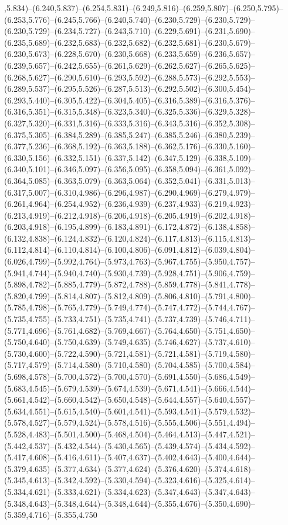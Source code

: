 ,5.834)--(6.240,5.837)--(6.254,5.831)--(6.249,5.816)--(6.259,5.807)--(6.250,5.795)--(6.253,5.776)--(6.245,5.766)--(6.240,5.740)--(6.230,5.729)--(6.230,5.729)--(6.230,5.729)--(6.234,5.727)--(6.243,5.710)--(6.229,5.691)--(6.231,5.690)--(6.235,5.689)--(6.232,5.683)--(6.232,5.682)--(6.232,5.681)--(6.230,5.679)--(6.230,5.673)--(6.228,5.670)--(6.230,5.668)--(6.233,5.659)--(6.236,5.657)--(6.239,5.657)--(6.242,5.655)--(6.261,5.629)--(6.262,5.627)--(6.265,5.625)--(6.268,5.627)--(6.290,5.610)--(6.293,5.592)--(6.288,5.573)--(6.292,5.553)--(6.289,5.537)--(6.295,5.526)--(6.287,5.513)--(6.292,5.502)--(6.300,5.454)--(6.293,5.440)--(6.305,5.422)--(6.304,5.405)--(6.316,5.389)--(6.316,5.376)--(6.316,5.351)--(6.315,5.348)--(6.323,5.340)--(6.325,5.336)--(6.329,5.328)--(6.327,5.320)--(6.331,5.316)--(6.333,5.316)--(6.343,5.316)--(6.352,5.308)--(6.375,5.305)--(6.384,5.289)--(6.385,5.247)--(6.385,5.246)--(6.380,5.239)--(6.377,5.236)--(6.368,5.192)--(6.363,5.188)--(6.362,5.176)--(6.330,5.160)--(6.330,5.156)--(6.332,5.151)--(6.337,5.142)--(6.347,5.129)--(6.338,5.109)--(6.340,5.101)--(6.346,5.097)--(6.356,5.095)--(6.358,5.094)--(6.361,5.092)--(6.364,5.085)--(6.363,5.079)--(6.363,5.064)--(6.352,5.041)--(6.331,5.013)--(6.317,5.007)--(6.310,4.986)--(6.296,4.987)--(6.290,4.969)--(6.279,4.979)--(6.261,4.964)--(6.254,4.952)--(6.236,4.939)--(6.237,4.933)--(6.219,4.923)--(6.213,4.919)--(6.212,4.918)--(6.206,4.918)--(6.205,4.919)--(6.202,4.918)--(6.203,4.918)--(6.195,4.899)--(6.183,4.891)--(6.172,4.872)--(6.138,4.858)--(6.132,4.838)--(6.124,4.832)--(6.120,4.824)--(6.117,4.813)--(6.115,4.813)--(6.112,4.814)--(6.110,4.814)--(6.100,4.806)--(6.091,4.812)--(6.039,4.804)--(6.026,4.799)--(5.992,4.764)--(5.973,4.763)--(5.967,4.755)--(5.950,4.757)--(5.941,4.744)--(5.940,4.740)--(5.930,4.739)--(5.928,4.751)--(5.906,4.759)--(5.898,4.782)--(5.885,4.779)--(5.872,4.788)--(5.859,4.778)--(5.841,4.778)--(5.820,4.799)--(5.814,4.807)--(5.812,4.809)--(5.806,4.810)--(5.791,4.800)--(5.785,4.798)--(5.765,4.779)--(5.749,4.774)--(5.747,4.772)--(5.744,4.767)--(5.735,4.755)--(5.733,4.751)--(5.735,4.741)--(5.737,4.739)--(5.746,4.711)--(5.771,4.696)--(5.761,4.682)--(5.769,4.667)--(5.764,4.650)--(5.751,4.650)--(5.750,4.640)--(5.750,4.639)--(5.749,4.635)--(5.746,4.627)--(5.737,4.610)--(5.730,4.600)--(5.722,4.590)--(5.721,4.581)--(5.721,4.581)--(5.719,4.580)--(5.717,4.579)--(5.714,4.580)--(5.710,4.580)--(5.704,4.585)--(5.700,4.584)--(5.698,4.578)--(5.700,4.572)--(5.700,4.570)--(5.691,4.550)--(5.686,4.549)--(5.683,4.545)--(5.679,4.539)--(5.674,4.539)--(5.671,4.541)--(5.666,4.544)--(5.661,4.542)--(5.660,4.542)--(5.650,4.548)--(5.644,4.557)--(5.640,4.557)--(5.634,4.551)--(5.615,4.540)--(5.601,4.541)--(5.593,4.541)--(5.579,4.532)--(5.578,4.527)--(5.579,4.524)--(5.578,4.516)--(5.555,4.506)--(5.551,4.494)--(5.528,4.483)--(5.501,4.500)--(5.468,4.504)--(5.464,4.513)--(5.447,4.521)--(5.442,4.537)--(5.432,4.544)--(5.430,4.565)--(5.439,4.574)--(5.434,4.592)--(5.417,4.608)--(5.416,4.611)--(5.407,4.637)--(5.402,4.643)--(5.400,4.644)--(5.379,4.635)--(5.377,4.634)--(5.377,4.624)--(5.376,4.620)--(5.374,4.618)--(5.345,4.613)--(5.342,4.592)--(5.330,4.594)--(5.323,4.616)--(5.325,4.614)--(5.334,4.621)--(5.333,4.621)--(5.334,4.623)--(5.347,4.643)--(5.347,4.643)--(5.348,4.643)--(5.348,4.644)--(5.348,4.644)--(5.355,4.676)--(5.350,4.690)--(5.359,4.716)--(5.355,4.750